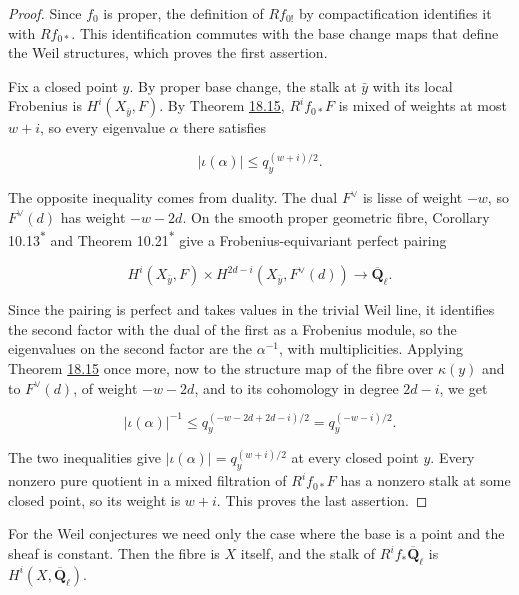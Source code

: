 \documentclass[11pt]{article}
\newcommand{\bpout}[1]{#1\textsuperscript{\hyperlink{bp-outside}{\ensuremath{\ast}}}}
\begin{document}
\begin{proof}[{Proof}]\label{bp324}%
Since \(f_0\) is proper, the definition of \(Rf_{0!}\) by compactification identifies it with \(Rf_{0*}\). This identification commutes with the base change maps that define the Weil structures, which proves the first assertion.

Fix a closed point \(y\). By proper base change, the stalk at \(\bar y\) with its local Frobenius is \(H^i(X_{\bar y},F)\). By Theorem \hyperref[bp315]{18.15}, \(R^if_{0*}F\) is mixed of weights at most \(w+i\), so every eigenvalue \(\alpha\) there satisfies

\[
|\iota(\alpha)|\leq q_y^{(w+i)/2}.
\]

The opposite inequality comes from duality. The dual \(F^\vee\) is lisse of weight \(-w\), so \(F^\vee(d)\) has weight \(-w-2d\). On the smooth proper geometric fibre, Corollary \bpout{10.13} and Theorem \bpout{10.21} give a Frobenius-equivariant perfect pairing

\[
H^i(X_{\bar y},F)\times
H^{2d-i}(X_{\bar y},F^\vee(d))\longrightarrow\overline{\mathbf Q}_\ell.
\]

Since the pairing is perfect and takes values in the trivial Weil line, it identifies the second factor with the dual of the first as a Frobenius module, so the eigenvalues on the second factor are the \(\alpha^{-1}\), with multiplicities. Applying Theorem \hyperref[bp315]{18.15} once more, now to the structure map of the fibre over \(\kappa(y)\) and to \(F^\vee(d)\), of weight \(-w-2d\), and to its cohomology in degree \(2d-i\), we get

\[
|\iota(\alpha)|^{-1}
\leq q_y^{(-w-2d+2d-i)/2}=q_y^{(-w-i)/2}.
\]

The two inequalities give \(|\iota(\alpha)|=q_y^{(w+i)/2}\) at every closed point \(y\). Every nonzero pure quotient in a mixed filtration of \(R^if_{0*}F\) has a nonzero stalk at some closed point, so its weight is \(w+i\). This proves the last assertion.
\end{proof}

\label{bp325}%
For the Weil conjectures we need only the case where the base is a point and the sheaf is constant. Then the fibre is \(X\) itself, and the stalk of \(R^if_*\overline{\mathbf Q}_\ell\) is \(H^i(X,\overline{\mathbf Q}_\ell)\).
\end{document}
